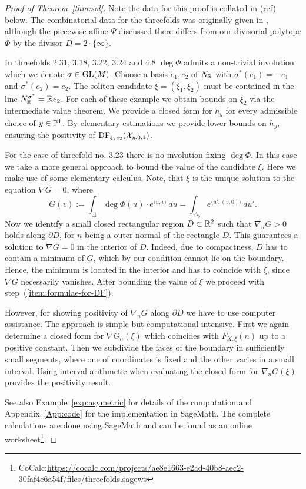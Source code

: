 \begin{proof}[Proof of Theorem~\ref{thm:sol}]
Note the data for this proof is collated in (ref) below. The combinatorial data for the threefolds was originally given in \cite{suss2013fano}, although the piecewise affine \(\Psi\) discussed there differs from our divisorial polytope \(\Phi\) by the divisor \(D = 2 \cdot \{ \infty \}\).

In threefolds 2.31, 3.18, 3.22, 3.24 and 4.8 $\deg \Phi$ admits a non-trivial involution which we denote $\sigma \in \operatorname{GL}(M)$. Choose a basis $e_1, e_2$ of $N_{\mathbb{R}}$ with $\sigma^*(e_1)=-e_1$ and $\sigma^*(e_2)=e_2$. The soliton candidate $\xi = (\xi_1,\xi_2)$ must be contained in the line $N_{\mathbb{R}}^{\sigma^*} = \mathbb{R} e_2$. For each of these example we obtain bounds on \(\xi_2\) via the intermediate value theorem. We provide a closed form for \(h_y\) for every admissible choice of $y \in \mathbb{P}^1$. By elementary estimations we provide lower bounds on \(h_y\), ensuring the positivity of $\mathop{\rm DF}\nolimits_{\xi_2 e_2}({\mathcal{X}}_{y,0,1})$.

For the case of threefold no. 3.23 there is no involution fixing $\deg \Phi$. In this case we take a more general approach to bound the value of the candidate \(\xi\). Here we make use of some elementary calculus. Note, that \(\xi\) is the unique solution to the equation \(\nabla G = 0 \), where 
\[
G(v) := \int_{\Box} \deg \bar \Phi(u) \cdot e^{\langle u, v \rangle}\, du = 
\int_{\Delta_0} e^{\langle u', (v,0) \rangle} \, du'.
\]
Now we identify a small closed rectangular region \(D \subset \mathbb{R}^2 \) such that \(\nabla_n G > 0 \) holds along \(\partial D\), for \(n\) being a outer normal of the rectangle \(D\). This guarantees a solution to \(\nabla G = 0 \) in the interior of \(D\). Indeed, due to compactness, $D$ has to contain a minimum of $G$, which by our condition cannot lie on the boundary. Hence, the minimum is located in the interior and has to coincide with $\xi$, since $\nabla G$ necessarily vanishes. After bounding the value of $\xi$ we proceed with step~(\ref{item:formulae-for-DF}). 

However, for showing positivity of $\nabla_n G$ along $\partial D$ we have to use computer assistance. The approach is simple but computational intensive. First we again determine a closed form for $\nabla G_n(\xi)$ which coincides with $F_{X,\xi}(n)$ up to a positive constant. Then we subdivide the faces of the boundary in sufficiently small segments, where one of coordinates is fixed and the other varies in a small interval. Using interval arithmetic when evaluating the closed form for $\nabla_n G(\xi)$ provides the positivity result.

See also Example~\ref{exp:asymetric} for details of the computation and Appendix~\ref{App:code} for the implementation in SageMath. The complete calculations are done using SageMath and can be found as an online worksheet\footnote{CoCalc:\url{https://cocalc.com/projects/ae8e1663-e2ad-40b8-aec2-30faf4e6a54f/files/threefolds.sagews}}.
\end{proof}
